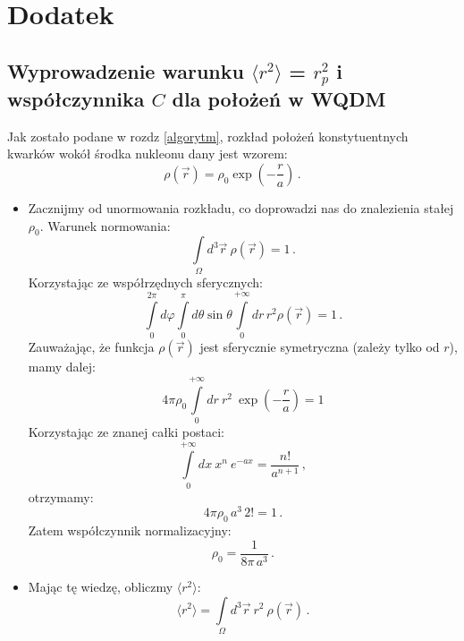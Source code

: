 \documentclass[a4paper,12pt]{article}
\begin{document}
\newpage
\appendix
\section{Dodatek}
\subsection{Wyprowadzenie  warunku $\langle r^2 \rangle$  = $r_p^2$ i współczynnika $C$ dla położeń w WQDM} \label{appendix-proof-C-and-rms}
Jak zostało podane w rozdz \ref{algorytm}, rozkład położeń konstytuentnych kwarków wokół środka nukleonu dany jest wzorem:
\begin{equation}\label{eq:eq-quark-distr-basic}
\rho(\vec{r})=\rho_0\exp\left(-\frac{r}{a}\right)\,.
\end{equation}
\begin{itemize}
\item Zacznijmy od unormowania rozkładu, co doprowadzi nas do znalezienia stałej $\rho_0$. Warunek normowania:
\begin{equation}\label{eq:norm-integral}
\int\limits_{\Omega} d^3\vec{r}\: \rho(\vec{r}) = 1\,.
\end{equation}
Korzystając ze współrzędnych sferycznych:
\begin{equation}
\int\limits_{0}^{2\pi}d\varphi \int\limits_{0}^{\pi}d\theta \sin\theta \int\limits_{0}^{+\infty}dr\, r^2 \rho(\vec{r}) = 1\,.
\end{equation}
Zauważając, że funkcja $\rho(\vec{r})$ jest sferycznie symetryczna (zależy tylko od $r$), mamy dalej:
\begin{equation}
4\pi \rho_0 \int\limits_{0}^{+\infty}dr\: r^2 \: \exp\left(-\frac{r}{a}\right) = 1
\end{equation}
Korzystając ze znanej całki postaci:
\begin{equation} \label{eq:integral01}
\int\limits_{0}^{+\infty}dx\: x^n \: e^{-ax} = \frac{n!}{a^{n+1}}\,,
\end{equation}
otrzymamy:
\[ 4\pi \rho_0 \, a^3\, 2! = 1\,. \]
Zatem współczynnik normalizacyjny:
\begin{equation}\label{eq:coeff}
\rho_0 = \frac{1}{8\pi \, a^3}\,.
\end{equation}

\item Mając tę wiedzę, obliczmy $\langle r^2 \rangle$:
\begin{equation} 
\langle r^2 \rangle = \int\limits_{\Omega} d^3\vec{r}\: r^2 \: \rho(\vec{r}) \,.
\end{equation}


\end{itemize}
\end{document}
